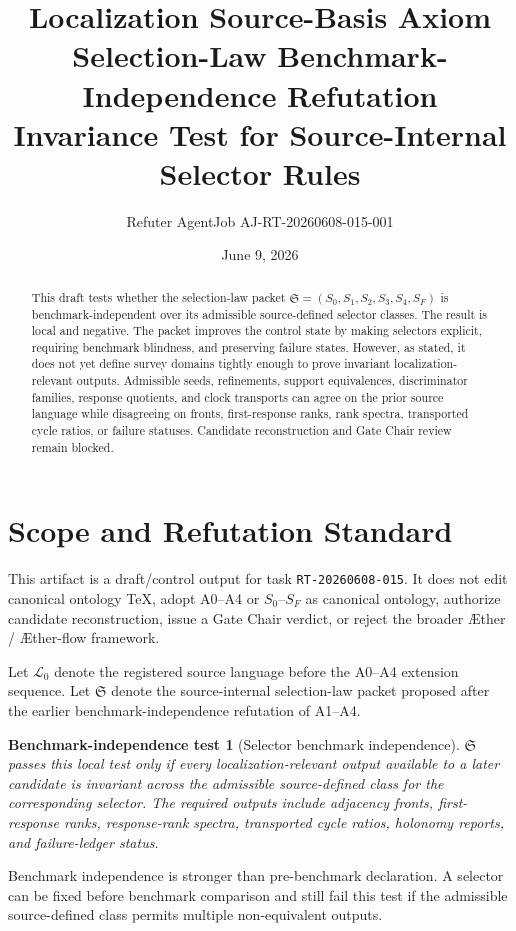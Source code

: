 \documentclass[11pt]{article}
\title{\textbf{Localization Source-Basis Axiom Selection-Law Benchmark-Independence Refutation}\\[0.35em]
\large Invariance Test for Source-Internal Selector Rules}
\author{Refuter AgentJob AJ-RT-20260608-015-001}
\date{June 9, 2026}
\newcommand{\Aether}{\AE{}ther}
\newcommand{\Aflow}{\AE{}ther-flow}
\newcommand{\TheoryProgram}{\Aether{} / \Aflow{} framework}
\newcommand{\Lang}{\mathcal{L}_{0}}
\newcommand{\Sel}{\mathfrak{S}}
\newtheorem{test}{Benchmark-independence test}
\begin{document}
\maketitle

\begin{abstract}
This draft tests whether the selection-law packet
\(\Sel=(S_0,S_1,S_2,S_3,S_4,S_F)\) is benchmark-independent over its
admissible source-defined selector classes. The result is local and negative.
The packet improves the control state by making selectors explicit, requiring
benchmark blindness, and preserving failure states. However, as stated, it
does not yet define survey domains tightly enough to prove invariant
localization-relevant outputs. Admissible seeds, refinements, support
equivalences, discriminator families, response quotients, and clock
transports can agree on the prior source language while disagreeing on fronts,
first-response ranks, rank spectra, transported cycle ratios, or failure
statuses. Candidate reconstruction and Gate Chair review remain blocked.
\end{abstract}

\section{Scope and Refutation Standard}

This artifact is a draft/control output for task \texttt{RT-20260608-015}. It
does not edit canonical ontology TeX, adopt A0--A4 or \(S_0\)--\(S_F\) as
canonical ontology, authorize candidate reconstruction, issue a Gate Chair
verdict, or reject the broader \TheoryProgram{}.

Let \(\Lang\) denote the registered source language before the A0--A4
extension sequence. Let \(\Sel\) denote the source-internal selection-law
packet proposed after the earlier benchmark-independence refutation of A1--A4.

\begin{test}[Selector benchmark independence]
\(\Sel\) passes this local test only if every localization-relevant output
available to a later candidate is invariant across the admissible
source-defined class for the corresponding selector. The required outputs
include adjacency fronts, first-response ranks, response-rank spectra,
transported cycle ratios, holonomy reports, and failure-ledger status.
\end{test}

Benchmark independence is stronger than pre-benchmark declaration. A selector
can be fixed before benchmark comparison and still fail this test if the
admissible source-defined class permits multiple non-equivalent outputs.
\end{document}
